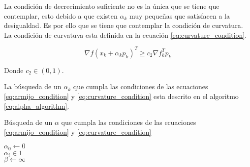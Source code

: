 La condición de decrecimiento suficiente no es la única que se tiene que contemplar, esto debido a que existen $\alpha_k$ muy pequeñas que satisfacen a la desigualdad. Es por ello que se tiene que contemplar la condición de curvatura. La condición de curvatuva esta definida en la ecuación \ref{eq:curvature_condition}.

\begin{equation}
    \nabla f(x_k + \alpha_k p_k)^T  \geq c_2 \nabla f_k^T p_k  \label{eq:curvature_condition}
\end{equation}

Donde $c_2 \in (0,1)$.


La búsqueda de un $\alpha_k$ que cumpla las condiciones de las ecuaciones \ref{eq:armijo_condition} y \ref{eq:curvature_condition} esta descrito en el algoritmo \ref{eq:alpha_algorithm}.

\begin{algorithm}
    \caption{Búsqueda de un $\alpha$ que cumpla las condiciones de las ecuaciones \ref{eq:armijo_condition} y \ref{eq:curvature_condition} \label{eq:alpha_algorithm}}
    $\alpha_0 \gets 0$\\
    $\alpha_i \in 1$\\
    $\beta \gets \infty$\\
\end{algorithm}